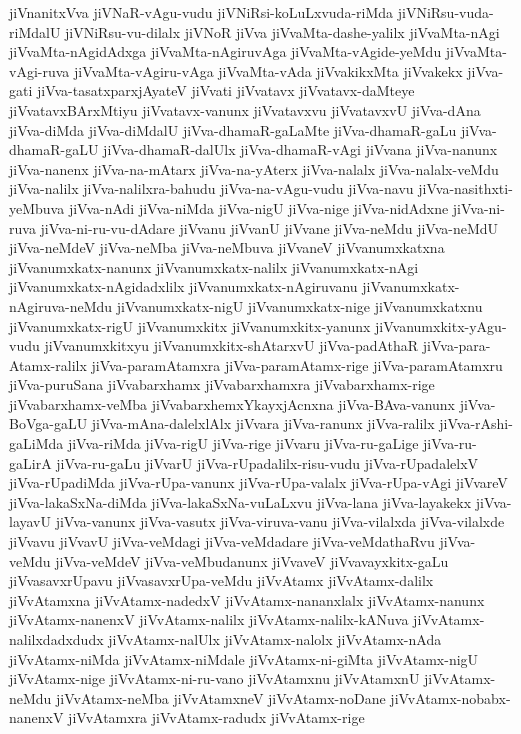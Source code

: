 {jiVnanitxVva
jiVNaR-vAgu-vudu
jiVNiRsi-koLuLxvuda-riMda
jiVNiRsu-vuda-riMdalU
jiVNiRsu-vu-dilalx
jiVNoR
jiVva
jiVvaMta-dashe-yalilx
jiVvaMta-nAgi
jiVvaMta-nAgidAdxga
jiVvaMta-nAgiruvAga
jiVvaMta-vAgide-yeMdu
jiVvaMta-vAgi-ruva
jiVvaMta-vAgiru-vAga
jiVvaMta-vAda
jiVvakikxMta
jiVvakekx
jiVva-gati
jiVva-tasatxparxjAyateV
jiVvati
jiVvatavx
jiVvatavx-daMteye
jiVvatavxBArxMtiyu
jiVvatavx-vanunx
jiVvatavxvu
jiVvatavxvU
jiVva-dAna
jiVva-diMda
jiVva-diMdalU
jiVva-dhamaR-gaLaMte
jiVva-dhamaR-gaLu
jiVva-dhamaR-gaLU
jiVva-dhamaR-dalUlx
jiVva-dhamaR-vAgi
jiVvana
jiVva-nanunx
jiVva-nanenx
jiVva-na-mAtarx
jiVva-na-yAterx
jiVva-nalalx
jiVva-nalalx-veMdu
jiVva-nalilx
jiVva-nalilxra-bahudu
jiVva-na-vAgu-vudu
jiVva-navu
jiVva-nasithxti-yeMbuva
jiVva-nAdi
jiVva-niMda
jiVva-nigU
jiVva-nige
jiVva-nidAdxne
jiVva-ni-ruva
jiVva-ni-ru-vu-dAdare
jiVvanu
jiVvanU
jiVvane
jiVva-neMdu
jiVva-neMdU
jiVva-neMdeV
jiVva-neMba
jiVva-neMbuva
jiVvaneV
jiVvanumxkatxna
jiVvanumxkatx-nanunx
jiVvanumxkatx-nalilx
jiVvanumxkatx-nAgi
jiVvanumxkatx-nAgidadxlilx
jiVvanumxkatx-nAgiruvanu
jiVvanumxkatx-nAgiruva-neMdu
jiVvanumxkatx-nigU
jiVvanumxkatx-nige
jiVvanumxkatxnu
jiVvanumxkatx-rigU
jiVvanumxkitx
jiVvanumxkitx-yanunx
jiVvanumxkitx-yAgu-vudu
jiVvanumxkitxyu
jiVvanumxkitx-shAtarxvU
jiVva-padAthaR
jiVva-para-Atamx-ralilx
jiVva-paramAtamxra
jiVva-paramAtamx-rige
jiVva-paramAtamxru
jiVva-puruSana
jiVvabarxhamx
jiVvabarxhamxra
jiVvabarxhamx-rige
jiVvabarxhamx-veMba
jiVvabarxhemxYkayxjAcnxna
jiVva-BAva-vanunx
jiVva-BoVga-gaLU
jiVva-mAna-dalelxlAlx
jiVvara
jiVva-ranunx
jiVva-ralilx
jiVva-rAshi-gaLiMda
jiVva-riMda
jiVva-rigU
jiVva-rige
jiVvaru
jiVva-ru-gaLige
jiVva-ru-gaLirA
jiVva-ru-gaLu
jiVvarU
jiVva-rUpadalilx-risu-vudu
jiVva-rUpadalelxV
jiVva-rUpadiMda
jiVva-rUpa-vanunx
jiVva-rUpa-valalx
jiVva-rUpa-vAgi
jiVvareV
jiVva-lakaSxNa-diMda
jiVva-lakaSxNa-vuLaLxvu
jiVva-lana
jiVva-layakekx
jiVva-layavU
jiVva-vanunx
jiVva-vasutx
jiVva-viruva-vanu
jiVva-vilalxda
jiVva-vilalxde
jiVvavu
jiVvavU
jiVva-veMdagi
jiVva-veMdadare
jiVva-veMdathaRvu
jiVva-veMdu
jiVva-veMdeV
jiVva-veMbudanunx
jiVvaveV
jiVvavayxkitx-gaLu
jiVvasavxrUpavu
jiVvasavxrUpa-veMdu
jiVvAtamx
jiVvAtamx-dalilx
jiVvAtamxna
jiVvAtamx-nadedxV
jiVvAtamx-nananxlalx
jiVvAtamx-nanunx
jiVvAtamx-nanenxV
jiVvAtamx-nalilx
jiVvAtamx-nalilx-kANuva
jiVvAtamx-nalilxdadxdudx
jiVvAtamx-nalUlx
jiVvAtamx-nalolx
jiVvAtamx-nAda
jiVvAtamx-niMda
jiVvAtamx-niMdale
jiVvAtamx-ni-giMta
jiVvAtamx-nigU
jiVvAtamx-nige
jiVvAtamx-ni-ru-vano
jiVvAtamxnu
jiVvAtamxnU
jiVvAtamx-neMdu
jiVvAtamx-neMba
jiVvAtamxneV
jiVvAtamx-noDane
jiVvAtamx-nobabx-nanenxV
jiVvAtamxra
jiVvAtamx-radudx
jiVvAtamx-rige
}
